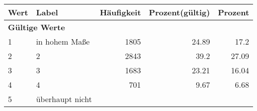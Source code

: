      \begin{longtable}{lXrrr}
     \toprule
     \textbf{Wert} & \textbf{Label} & \textbf{Häufigkeit} & \textbf{Prozent(gültig)} & \textbf{Prozent} \\
     \endhead
     \midrule
     \multicolumn{5}{l}{\textbf{Gültige Werte}}\\

     1 &
     \multicolumn{1}{X}{ in hohem Maße   } &


       \num{1805} &
       \num[round-mode=places,round-precision=2]{24.89} &
         \num[round-mode=places,round-precision=2]{17.2} \\

     2 &
     \multicolumn{1}{X}{ 2   } &


       \num{2843} &
       \num[round-mode=places,round-precision=2]{39.2} &
         \num[round-mode=places,round-precision=2]{27.09} \\

     3 &
     \multicolumn{1}{X}{ 3   } &


       \num{1683} &
       \num[round-mode=places,round-precision=2]{23.21} &
         \num[round-mode=places,round-precision=2]{16.04} \\

     4 &
     \multicolumn{1}{X}{ 4   } &


       \num{701} &
       \num[round-mode=places,round-precision=2]{9.67} &
         \num[round-mode=places,round-precision=2]{6.68} \\

     5 &
     \multicolumn{1}{X}{ überhaupt nicht   } &



\end{longtable}
